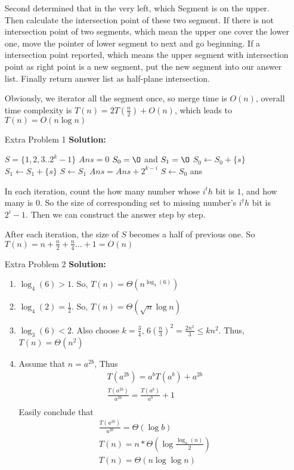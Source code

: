 \normalfont\documentclass[letterpaper,11pt]{article}
\begin{document}
\begin{enumerate}
	Second determined that in the very left, which Segment is on the upper. Then calculate the intersection point of these two segment. If there is not intersection point of two segments, which mean the upper one cover the lower one, move the pointer of lower segment to next and go beginning. If a intersection point reported, which means the upper segment with intersection point as right point is a new segment, put the new segment into our answer list.
	Finally return answer list as half-plane intersection.\par
	Obviously, we iterator all the segment once, so merge time is $O(n)$, overall time complexity is $T(n) = 2 T(\frac{n}{2}) + O(n)$, which leads to $T(n) = O(n\log n)$
\item [Extra Problem 1]\textbf{Solution:}\par
	\begin{algorithmic}
			\State $S = \{1,2,3..2^k-1\}$
			\State $Ans = 0$
				\State $S_0 = \O$ and $S_1 = \O$
						\State $S_0 \gets S_0 + \{s\}$
					\Else
						\State $S_1 \gets S_1 + \{s\}$
					\EndIf
				\EndFor
					\State $S \gets S_1$
					\State $Ans = Ans + 2^{k-i}$
				\Else 
					\State $S \gets S_0$
				\EndIf 
			\EndFor
			\State \Return ans
		\EndFunction
	\end{algorithmic}
	In each iteration, count the how many number whose $i^th$ bit is $1$, and how many is $0$. So the size of corresponding set to missing number's $i^th$ bit is $2^i - 1$. Then we can construct the answer step by step.\par
	After each iteration, the size of $S$ becomes a half of previous one. So $T(n) = n + \frac{n}{2} + \frac{n}{4}... + 1 = O(n)$ 
\item [Extra Problem 2]\textbf{Solution:}\par
	\begin{enumerate}
	\item $\log_4(6) > 1$. So, $T(n) = \Theta(n^{\log_4(6)})$
	\item $\log_4(2) = \frac{1}{2}$. So, $T(n) = \Theta(\sqrt{n}\log n)$
	\item $\log_3(6) < 2$. Also choose $k = \frac{3}{4}$, $6(\frac{n}{3})^2 = \frac{2n^2}{3} \le kn^2$. Thus, $T(n) = \Theta(n^2)$
	\item Assume that $n = a ^{2b}$, Thus	
		\begin{gather*}
			T(a^{2b}) = a^{b}T(a^b) + a^{2b} \\ 
			\frac{T(a^{2b})}{a^{2b}} = \frac{T(a^{b})}{a^{b}} + 1\\
		\end{gather*}
		Easily conclude that
		\begin{gather*}
			\frac{T(a^{2b})}{a^{2b}} = \Theta(\log {b})\\
			T(n) = n * \Theta(\log {\frac{\log_a(n)}{2}})\\
			T(n) = \Theta(n\log{\log n})
		\end{gather*}
	\end{enumerate}
\end{enumerate}
\end{document}
